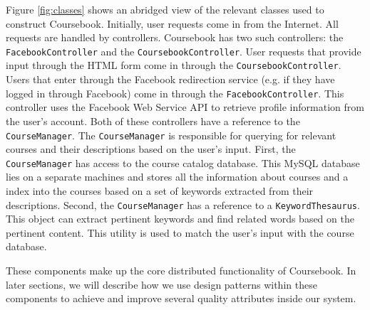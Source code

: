 Figure \ref{fig:classes} shows an abridged view of the relevant classes used to
construct Coursebook. Initially, user requests come in from the Internet. All
requests are handled by controllers. Coursebook has two such controllers: the
\verb!FacebookController! and the \verb!CoursebookController!. User requests
that provide input through the HTML form come in through the
\verb!CoursebookController!. Users that enter through the Facebook redirection
service (e.g. if they have logged in through Facebook) come in through the
\verb!FacebookController!. This controller uses the Facebook Web Service API to
retrieve profile information from the user's account. Both of these controllers
have a reference to the \verb!CourseManager!. The \verb!CourseManager! is
responsible for querying for relevant courses and their descriptions based on
the user's input. First, the \verb!CourseManager! has access to the course
catalog database. This MySQL database lies on a separate machines and stores all
the information about courses and a index into the courses based on a set of
keywords extracted from their descriptions. Second, the \verb!CourseManager! has
a reference to a \verb!KeywordThesaurus!. This object can extract pertinent  
keywords and find related words based on the pertinent content. This utility is
used to match the user's input with the course database.

These components make up the core distributed functionality of Coursebook. In
later sections, we will describe how we use design patterns within these
components to achieve and improve several quality attributes inside our system. 
